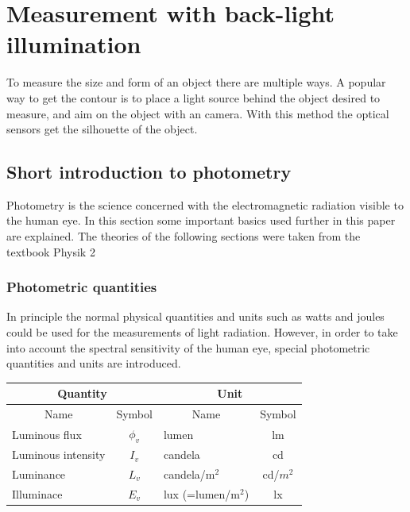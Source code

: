 \section{Measurement with back-light illumination}
To measure the size and form of an object there are multiple ways. A popular way to get the contour is to place a light source behind the object desired to measure, and aim on the object with an camera. With this method the optical sensors get the silhouette of the object. 
\subsection{Short introduction to photometry}
Photometry is the science concerned with the electromagnetic radiation visible to the human eye. In this section some important basics used further in this paper are explained. The theories of the following sections were taken from the textbook Physik 2 \cite{ruh}
\subsubsection{Photometric quantities}
In principle the normal physical quantities and units such as watts and joules could be used for the measurements of light radiation. However, in order to take into account the spectral sensitivity of the human eye, special photometric quantities and units are introduced.\\

\begin{table}[ht]
\centering
\begin{tabular}{ |p{6cm} p{2cm}|p{6cm} p{2cm}|  }
	\hline
	\multicolumn{2}{|c}{Quantity}&\multicolumn{2}{|c|}{Unit} \\
	\hline\hline
	\multicolumn{1}{|c}{Name}			& \multicolumn{1}{|c|}{Symbol}	& \multicolumn{1}{c}{Name}	& \multicolumn{1}{|c|}{Symbol}	\\

	\hline
	Luminous flux		& \multicolumn{1}{|c|}{$\phi_v$}	& lumen		& \multicolumn{1}{|c|}{lm}\\
	Luminous intensity 	& \multicolumn{1}{|c|}{$I_v$} 		& candela	& \multicolumn{1}{|c|}{cd}\\
	Luminance			& \multicolumn{1}{|c|}{$L_v$}		& candela/$\text{m}^2$	& \multicolumn{1}{|c|}{cd/$m^2$}\\
	Illuminace 			& \multicolumn{1}{|c|}{$E_v$} 		& lux (=lumen/$\text{m}^2$) 	& \multicolumn{1}{|c|}{lx}\\

	\hline
\end{tabular}
\end{table}






